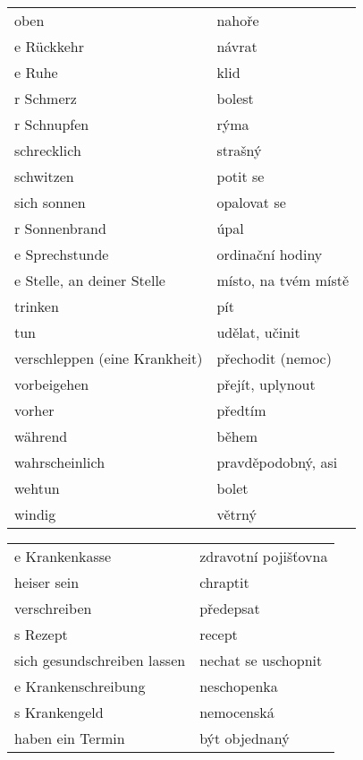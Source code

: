 \documentclass{article}
\begin{document}
\begin{tabular}{ p{5cm}|p{5cm}  }
    oben & nahoře\\
    e Rückkehr & návrat\\
    e Ruhe & klid\\
    r Schmerz & bolest\\
    r Schnupfen & rýma\\
    schrecklich & strašný\\
    schwitzen & potit se\\
    sich sonnen & opalovat se\\
    r Sonnenbrand & úpal\\
    e Sprechstunde & ordinační hodiny\\
    e Stelle, an deiner Stelle & místo, na tvém místě\\
    trinken & pít\\
    tun & udělat, učinit\\
    verschleppen (eine Krankheit) & přechodit (nemoc)\\
    vorbeigehen & přejít, uplynout\\
    vorher & předtím\\
    während & během\\
    wahrscheinlich & pravděpodobný, asi\\
    wehtun & bolet\\
    windig & větrný\\
\end{tabular}

\begin{tabular}{ p{5cm}|p{5cm}  }
    e Krankenkasse & zdravotní pojišťovna\\
    heiser sein & chraptit\\
    verschreiben & předepsat\\
    s Rezept & recept\\
    sich gesundschreiben lassen & nechat se uschopnit\\
    e Krankenschreibung & neschopenka\\
    s Krankengeld & nemocenská\\
    haben ein Termin & být objednaný\\
\end{tabular}
\end{document}
